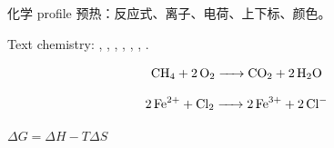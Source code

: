 


\begin{preview}

化学 profile 预热：反应式、离子、电荷、上下标、颜色。

Text chemistry:
, , , , ,
, .

\[
  \ce{CH4 + 2O2 -> CO2 + 2H2O}
\]

\[
  \ce{2Fe^{2+} + Cl2 -> 2Fe^{3+} + 2Cl-}
\]

{\color{blue}}
{\color{red}$\Delta G = \Delta H - T\Delta S$}

\end{preview}

